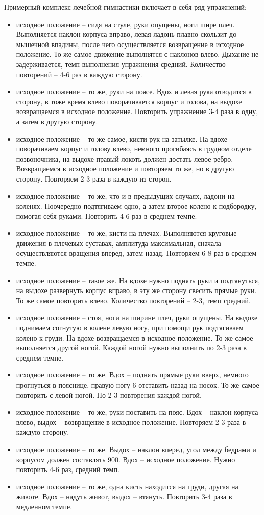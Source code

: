 \documentclass[a4paper]{article}
\begin{document}
    Примерный комплекс лечебной гимнастики включает в себя ряд упражнений:
    \begin{itemize}
        \item исходное положение – сидя на стуле, руки опущены, ноги шире плеч. Выполняется наклон корпуса вправо, левая ладонь плавно скользит до мышечной впадины, после чего осуществляется возвращение в исходное положение. То же самое движение выполнятся с наклонов влево. Дыхание не задерживается, темп выполнения упражнения средний. Количество повторений – 4-6 раз в каждую сторону.
        \item исходное положение – то же, руки на поясе. Вдох и левая рука отводится в сторону, в тоже время влево поворачивается корпус и голова, на выдохе возвращаемся в исходное положение. Повторить упражнение 3-4 раза в одну, а затем в другую сторону.
        \item исходное положение – то же самое, кисти рук на затылке. На вдохе поворачиваем корпус и голову влево, немного прогибаясь в грудном отделе позвоночника, на выдохе правый локоть должен достать левое ребро. Возвращаемся в исходное положение и повторяем то же, но в другую сторону. Повторяем 2-3 раза в каждую из сторон.
        \item исходное положение – то же, что и в предыдущих случаях, ладони на коленях. Поочередно подтягиваем одно, а затем второе колено к подбородку, помогая себя руками. Повторить 4-6 раз в среднем темпе.
        \item исходное положение – то же, кисти на плечах. Выполняются круговые движения в плечевых суставах, амплитуда максимальная, сначала осуществляются вращения вперед, затем назад. Повторяем 6-8 раз в среднем темпе.
        \item исходное положение – такое же. На вдохе нужно поднять руки и подтянуться, на выдохе развернуть корпус вправо, в эту же сторону свесить прямые руки. То же самое повторить влево. Количество повторений – 2-3, темп средний.
        \item исходное положение – стоя, ноги на ширине плеч, руки опущены. На выдохе поднимаем согнутую в колене левую ногу, при помощи рук подтягиваем колено к груди. На вдохе возвращаемся в исходное положение. То же самое выполняется другой ногой. Каждой ногой нужно выполнить по 2-3 раза в среднем темпе.
        \item исходное положение – то же. Вдох – поднять прямые руки вверх, немного прогнуться в пояснице, правую ногу 6 отставить назад на носок. То же самое повторить с левой ногой. По 2-3 повторения каждой ногой.
        \item исходное положение – то же, руки поставить на пояс. Вдох – наклон корпуса влево, выдох – возвращение в исходное положение. Повторяем 2-3 раза в каждую сторону.
        \item исходное положение – то же. Выдох – наклон вперед, угол между бедрами и корпусом должен составлять 900. Вдох – исходное положение. Нужно повторить 4-6 раз, средний темп.
        \item исходное положение – то же, одна кисть находится на груди, другая на животе. Вдох – надуть живот, выдох – втянуть. Повторить 3-4 раза в медленном темпе.
    \end{itemize}
    
\end{document}
